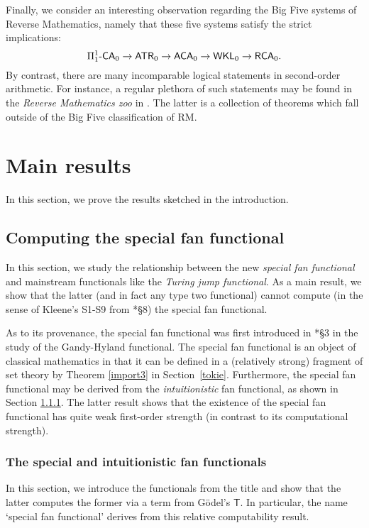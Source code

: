 \documentclass[reqno]{amsart}
\newcommand\be{\begin{equation}}
\newcommand\ee{\end{equation}}
\def\FIVE{\Pi_{1}^{1}\text{-\textsf{CA}}_{0}}
\def\ATR{\textup{\textsf{ATR}}}
\def\RCA{\textup{\textsf{RCA}}}
\def\WKL{\textup{\textsf{WKL}}}
\def\di{\rightarrow}
\def\ACA{\textup{\textsf{ACA}}}
\numberwithin{equation}{section}
\numberwithin{thm}{section}
\begin{document}
\medskip

Finally, we consider an interesting observation regarding the Big Five systems of Reverse Mathematics, namely that these five systems satisfy the strict implications:
\be\label{linord}
\FIVE\di \ATR_{0}\di \ACA_{0}\di\WKL_{0}\di \RCA_{0}.
\ee
By contrast, there are many incomparable logical statements in second-order arithmetic.  For instance, a regular plethora of such statements may be found in the \emph{Reverse Mathematics zoo} in \cite{damirzoo}.  The latter is a collection of theorems which fall outside of the Big Five classification of RM.  

\section{Main results}
In this section, we prove the results sketched in the introduction.  

\subsection{Computing the special fan functional}\label{prim}
In this section, we study the relationship between the new \emph{special fan functional} and mainstream functionals like the \emph{Turing jump functional}.
As a main result, we show that the latter (and in fact any type two functional) cannot compute (in the sense of Kleene's S1-S9 from \cite{longmann}*{\S8}) the special fan functional.    

\medskip

As to its provenance, the special fan functional was first introduced in \cite{samGH}*{\S3} in the study of the Gandy-Hyland functional.  
The special fan functional is an object of classical mathematics in that it can be defined in a (relatively strong) fragment of set theory by Theorem \ref{import3} in Section~\ref{tokie}.  
Furthermore, the special fan functional  may be derived from the \emph{intuitionistic} fan functional, as shown in Section \ref{indie}.  The latter result shows that the existence of the special fan functional has quite weak first-order strength (in contrast to its computational strength).       %

\subsubsection{The special and intuitionistic fan functionals}\label{indie}
In this section, we introduce the functionals from the title and show that the latter computes the former via a term from G\"odel's $\textsf{T}$.  
In particular, the name `special fan functional' derives from this relative computability result.   
\end{document}
